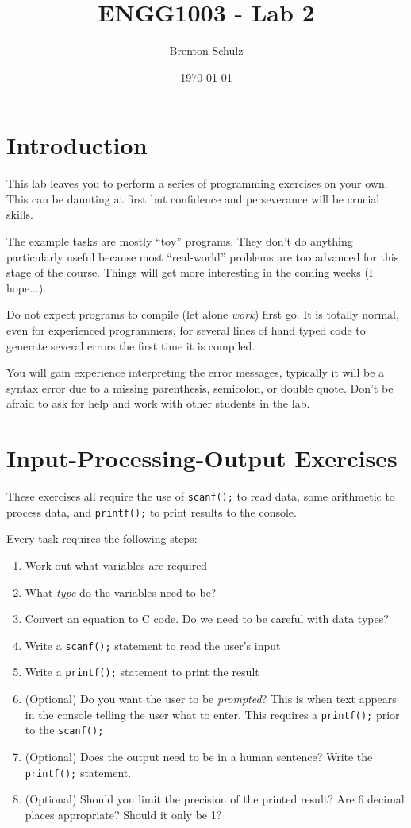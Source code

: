 \documentclass{lab}
\title{ENGG1003 - Lab 2}
\author{Brenton Schulz}
\date{\today}
\begin{document}
\maketitle

\section{Introduction}

This lab leaves you to perform a series of programming exercises on your own. This can be daunting at first but confidence and perseverance will be crucial skills.

The example tasks are mostly ``toy'' programs. They don't do anything particularly useful because most ``real-world'' problems are too advanced for this stage of the course. Things will get more interesting in the coming weeks (I hope...).

Do not expect programs to compile (let alone \textit{work}) first go. It is totally normal, even for experienced programmers, for several lines of hand typed code to generate several errors the first time it is compiled.

You will gain experience interpreting the error messages, typically it will be a syntax error due to a missing parenthesis, semicolon, or double quote. Don't be afraid to ask for help and work with other students in the lab.

\section{Input-Processing-Output Exercises}

These exercises all require the use of \texttt{scanf();} to read data, some arithmetic to process data, and \texttt{printf();} to print results to the console.

Every task requires the following steps:

\begin{enumerate}
\item Work out what variables are required
\item What \textit{type} do the variables need to be?
\item Convert an equation to C code. Do we need to be careful with data types?
\item Write a \texttt{scanf();} statement to read the user's input
\item Write a \texttt{printf();} statement to print the result
\item (Optional) Do you want the user to be \textit{prompted}? This is when text appears in the console telling the user what to enter. This requires a \texttt{printf();} prior to the \texttt{scanf();}
\item (Optional) Does the output need to be in a human sentence? Write the \texttt{printf();} statement.
\item (Optional) Should you limit the precision of the printed result? Are 6 decimal places appropriate? Should it only be 1?
\end{enumerate}
\end{document}
